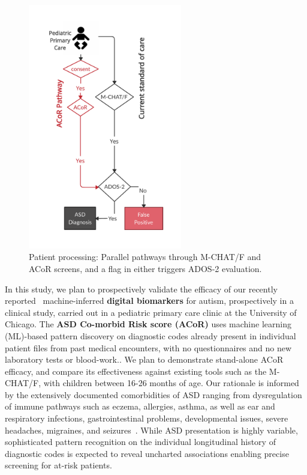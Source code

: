 \documentclass[onecolumn, compsoc,11pt]{IEEEtran}
\renewcommand{\captionN}[1]{\caption{\color{CadetBlue4!80!black} \sffamily \fontsize{9}{10}\selectfont #1  }}
\def\acor{ACoR\xspace}
\begin{document}
\begin{figure}
  \vspace{-40pt}
  
  \hspace{-25pt}\includegraphics[width=2.65in]{Figures/flowx}
  \vspace{-45pt}
  
  \captionN{Patient processing: Parallel pathways through M-CHAT/F and \acor screens, and
  a flag in either triggers ADOS-2 evaluation.}\label{figflow}
\end{figure}%
%
In this study, we plan to prospectively validate the efficacy of our recently reported~\cite{Onishchenko_2021}  machine-inferred \textbf{digital biomarkers} for autism, prospectively in a  clinical study, carried out in a
pediatric primary care clinic at the University of Chicago. The \textbf{ ASD Co-morbid Risk score (\acor)} uses machine learning (ML)-based pattern discovery on diagnostic codes already present in individual patient files from past medical encounters, with no questionnaires and no new laboratory tests or blood-work.. We plan to demonstrate stand-alone \acor efficacy, and compare its effectiveness against existing  tools such as the M-CHAT/F, with children between 16-26 months of age. Our rationale is informed by the extensively documented comorbidities of ASD ranging from dysregulation of immune pathways such as eczema, allergies, asthma, as well as ear and respiratory infections, gastrointestinal problems, developmental issues, severe headaches, migraines, and seizures~\cite{pmid30733689,pmid22511918}. While ASD presentation is highly variable, sophisticated pattern recognition on the individual longitudinal history of  diagnostic codes is expected to reveal uncharted associations enabling precise screening for at-risk patients.
\end{document}
